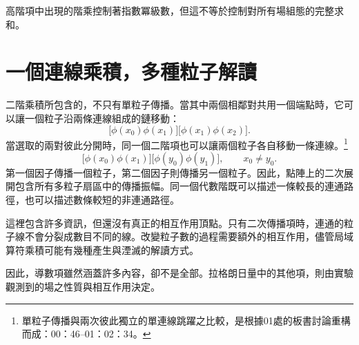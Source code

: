 高階項中出現的階乘控制著指數冪級數，但這不等於控制對所有場組態的完整求和。

\begin{classroomqa}
\end{classroomqa}

\section{一個連線乘積，多種粒子解讀}

二階乘積所包含的，不只有單粒子傳播。當其中兩個相鄰對共用一個端點時，它可以讓一個粒子沿兩條連線組成的鏈移動：
\begin{equation}
\bigl[\phi(x_0)\phi(x_1)\bigr]
\bigl[\phi(x_1)\phi(x_2)\bigr].
\end{equation}
當選取的兩對彼此分開時，同一個二階項也可以讓兩個粒子各自移動一條連線。\footnote{單粒子傳播與兩次彼此獨立的單連線跳躍之比較，是根據01處的板書討論重構而成：00：46--01：02：34。}
\begin{equation}
\bigl[\phi(x_0)\phi(x_1)\bigr]
\bigl[\phi(y_0)\phi(y_1)\bigr],
\qquad x_0\neq y_0.
\end{equation}
第一個因子傳播一個粒子，第二個因子則傳播另一個粒子。因此，點陣上的二次展開包含所有多粒子扇區中的傳播振幅。同一個代數階既可以描述一條較長的連通路徑，也可以描述數條較短的非連通路徑。

這裡包含許多資訊，但還沒有真正的相互作用頂點。只有二次傳播項時，連通的粒子線不會分裂成數目不同的線。改變粒子數的過程需要額外的相互作用，儘管局域算符乘積可能有幾種產生與湮滅的解讀方式。

\begin{classroomqa}
\end{classroomqa}


因此，導數項雖然涵蓋許多內容，卻不是全部。拉格朗日量中的其他項，則由實驗觀測到的場之性質與相互作用決定。

